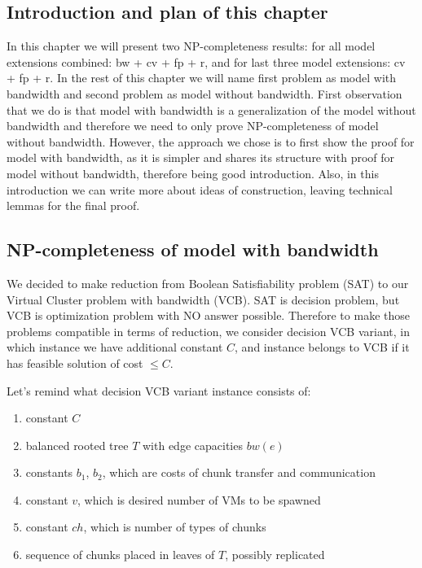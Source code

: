 \subsection{Introduction and plan of this chapter}

In this chapter we will present two NP-completeness results: for all
model extensions combined: bw + cv + fp + r, and for last three model
extensions: cv + fp + r. In the rest of this chapter we will name
first problem as model with bandwidth and second problem as model
without bandwidth. First observation that we do is that model with
bandwidth is a generalization of the model without bandwidth and
therefore we need to only prove NP-completeness of model without
bandwidth. However, the approach we chose is to first show the proof
for model with bandwidth, as it is simpler and shares its structure
with proof for model without bandwidth, therefore being good
introduction. Also, in this introduction we can write more about ideas
of construction, leaving technical lemmas for the final proof.

\subsection{NP-completeness of model with bandwidth}

We decided to make reduction from Boolean Satisfiability problem (SAT)
to our Virtual Cluster problem with bandwidth (VCB). SAT is decision
problem, but VCB is optimization problem with NO answer
possible. Therefore to make those problems compatible in terms of
reduction, we consider decision VCB variant, in which instance we have
additional constant $C$, and instance belongs to VCB if it has feasible
solution of cost $\leq C$.

Let's remind what decision VCB variant instance consists of:
\begin{enumerate}
\item constant $C$
\item balanced rooted tree $T$ with edge capacities $bw(e)$
\item constants $b_1$, $b_2$, which are costs of chunk transfer and
communication
\item constant $v$, which is desired number of VMs to be spawned
\item constant $ch$, which is number of types of chunks
\item sequence of chunks placed in leaves of $T$, possibly replicated
\end{enumerate}

